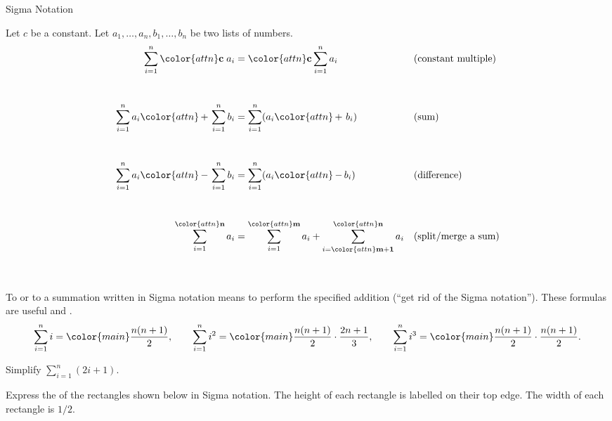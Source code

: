 \documentclass[../main.tex]{subfiles}
\begin{document}
\begin{lesson}{Sigma Notation}
  \clearpage
  \begin{mdframed}[style=withref-compact]
    \label{page:summation-properties}
    Let \(c\) be a constant. Let \(a_{1}, \dots, a_{n}, b_{1}, \dots, b_{n}\) be two lists of numbers. 
    \begin{align*}
      \sum_{i=1}^{n} {\color{attn} \mathbf{c}} \; a_{i} 
      &= {\color{attn} \mathbf{c}} \sum_{i=1}^{n} a_{i} 
      &&\text{(constant multiple)} \\[6ex]
      \sum_{i=1}^{n} a_{i} {\color{attn}\,\mathbf{+}\,} \sum_{i=1}^{n} b_{i} 
      &= \sum_{i=1}^{n} (a_{i} {\color{attn}\,\mathbf{+}\,}\, b_{i}) 
      &&\text{(sum)} \\[6ex]
      \sum_{i=1}^{n} a_{i} {\color{attn}\,\mathbf{-}\,} \sum_{i=1}^{n} b_{i} 
      &= \sum_{i=1}^{n} (a_{i} {\color{attn}\,\mathbf{-}\,} b_{i})
      && \text{(difference)} \\[6ex]
      \sum_{i=1}^{{\color{attn}\mathbf{n}}} a_{i} 
      &= 
      \sum_{i=1}^{{\color{attn}\mathbf{m}}} a_{i} + 
      \sum_{i={\color{attn}\mathbf{m+1}}}^{{\color{attn}\mathbf{n}}} a_{i} 
      && \text{(split/merge a sum)} \\[6ex]
    \end{align*}

  \end{mdframed}

  To  or to  a summation written in Sigma notation means to perform the specified addition (``get rid of the Sigma notation'').  These formulas are useful and .
  \begin{equation} \label{formula:summations}
    \sum_{i=1}^{n} i = {\color{main} \frac{n(n+1)}{2}}, \qquad \sum_{i=1}^{n} i^{2} = {\color{main}\frac{n(n+1)}{2}} \cdot \frac{2n+1}{3}, \qquad \sum_{i=1}^{n} i^{3} = {\color{main}\frac{n(n+1)}{2}} \cdot \frac{n(n+1)}{2}.
  \end{equation}

  \begin{example}
    Simplify \(\sum_{i=1}^{n}(2i + 1)\).
  \end{example}
  \clearpage

  \begin{example}
    Express the  of the rectangles shown below in Sigma notation. The height of each rectangle is labelled on their top edge. The width of each rectangle is \(1/2\).


\end{example}
\end{lesson}
\end{document}
